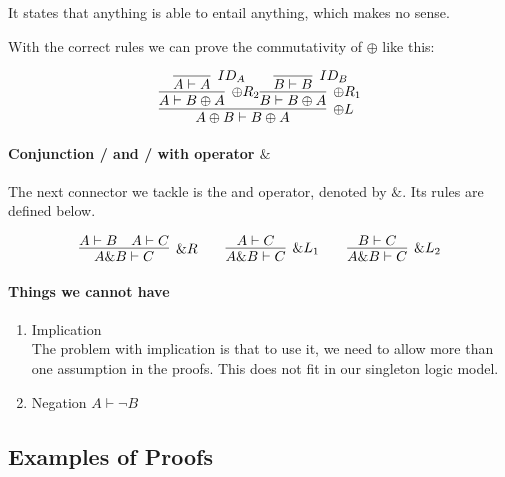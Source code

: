 \documentclass{article}
\begin{document}
It states that anything is able to entail anything, which makes no sense.

\medskip

With the correct rules we can prove  the commutativity of \(\oplus\) like this:

\[
\infer[{\oplus L}]
{A \oplus B \vdash B \oplus A}
{
	\infer[{\oplus R_2}]
	{A \vdash B \oplus A}
	{
		\infer[{ID_A}]
		{A \vdash A}
		{}
	}
	\infer[{\oplus R_1}]
	{B \vdash B \oplus A}
	{
		\infer[{ID_B}]
		{B \vdash B}
		{}
	}
}
\]



\paragraph{Conjunction / and / with operator \(\&\)}
The next connector we tackle is the and operator, denoted by \(\&\). Its rules are defined below. 

\[
\infer[{ \& R}]
{A \& B \vdash C}
{A \vdash B & A \vdash C}
\qquad
\infer[{\& L_1}]
{A \& B \vdash C}
{A \vdash C}
\qquad
\infer[{\& L_2}]
{A \& B \vdash C}
{B \vdash C}
\]


\paragraph{Things we cannot have}
\begin{enumerate}
	\item Implication \\
	      The problem with implication is that to use it, we need to allow 
	      more than one assumption in the proofs. This does not fit in our
	      singleton logic model.
	\item Negation \(A \vdash \neg B\)
\end{enumerate}





\subsection{Examples of Proofs}
\end{document}
